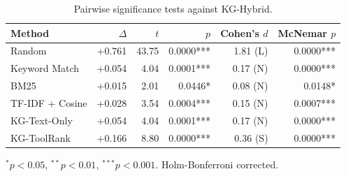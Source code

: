 \begin{table}[t]
\centering
\caption{Pairwise significance tests against KG-Hybrid.}
\label{tab:significance}
\begin{tabular}{lrrrrr}
\toprule
Method & $\Delta$ & $t$ & $p$ & Cohen's $d$ & McNemar $p$ \\
\midrule
Random & +0.761 & 43.75 & 0.0000*** & 1.81 (L) & 0.0000*** \\
Keyword Match & +0.054 & 4.04 & 0.0001*** & 0.17 (N) & 0.0000*** \\
BM25 & +0.015 & 2.01 & 0.0446* & 0.08 (N) & 0.0148* \\
TF-IDF + Cosine & +0.028 & 3.54 & 0.0004*** & 0.15 (N) & 0.0007*** \\
KG-Text-Only & +0.054 & 4.04 & 0.0001*** & 0.17 (N) & 0.0000*** \\
KG-ToolRank & +0.166 & 8.80 & 0.0000*** & 0.36 (S) & 0.0000*** \\
\bottomrule
\end{tabular}
\vspace{2pt}
\footnotesize{$^{*}p<0.05$, $^{**}p<0.01$, $^{***}p<0.001$. Holm-Bonferroni corrected.}
\end{table}